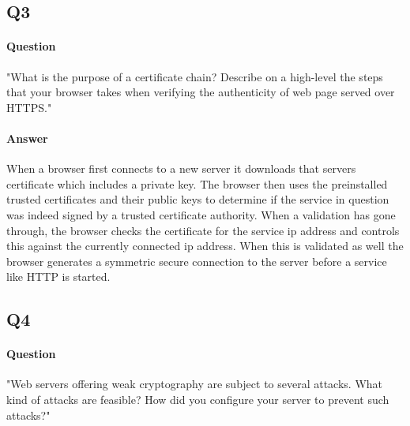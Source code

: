 \documentclass[11pt, a4paper]{article}
\begin{document}
\subsection{Q3}
\paragraph{Question}
"What is the purpose of a certificate chain? Describe on a high-level the steps that your browser takes when verifying the authenticity of web page served over HTTPS."
\paragraph{Answer}
When a browser first connects to a new server it downloads that servers certificate which includes a private key. The browser then uses the preinstalled trusted certificates and their public keys to determine if the service in question was indeed signed by a trusted certificate authority. When a validation has gone through, the browser checks the certificate for the service ip address and controls this against the currently connected ip address. When this is validated as well the browser generates a symmetric secure connection to the server before a service like HTTP is started. 
\subsection{Q4}
\paragraph{Question}
"Web servers offering weak cryptography are subject to several attacks. What kind of attacks are feasible? How did you configure your server to prevent such attacks?"
\end{document}
